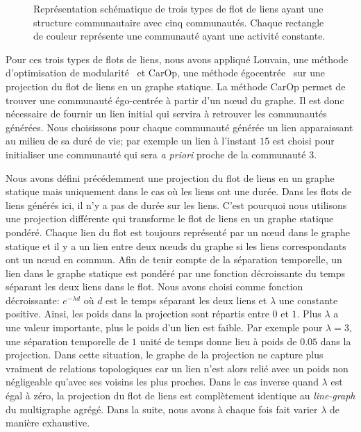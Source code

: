 \begin{figure}
\begin{subfigure}{0.3\textwidth}
		\caption{}
		\label{fig:versqualite_gen_test3}
	\end{subfigure}
	\caption{Représentation schématique de trois types de flot de liens ayant une structure communautaire avec cinq communautés.
	Chaque rectangle de couleur représente une communauté ayant une activité constante.}
	\label{fig:versqualite_gen_test}
\end{figure}

\bigskip
Pour ces trois types de flots de liens, nous avons appliqué Louvain, une méthode d'optimisation de modularité~\cite{Blondel2008a} et CarOp, une méthode égocentrée~\cite{Danisch2012} sur une projection du flot de liens en un graphe statique.
La méthode CarOp permet de trouver une communauté égo-centrée à partir d'un n\oe{}ud du graphe.
Il est donc nécessaire de fournir un lien initial qui servira à retrouver les communautés générées.
Nous choisissons pour chaque communauté générée un lien apparaissant au milieu de sa duré de vie; par exemple un lien à l'instant $15$ est choisi pour initialiser une communauté qui sera \emph{a priori} proche de la communauté $3$.


Nous avons défini précédemment une projection du flot de liens en un graphe statique mais uniquement dans le cas où les liens ont une durée.
Dans les flots de liens générés ici, il n'y a pas de durée sur les liens.
C'est pourquoi nous utilisons une projection différente qui transforme le flot de liens en un graphe statique pondéré.
Chaque lien du flot est toujours représenté par un n\oe{}ud dans le graphe statique et il y a un lien entre deux n\oe{}uds du graphe si les liens correspondants ont un n\oe{}ud en commun.
Afin de tenir compte de la séparation temporelle, un lien dans le graphe statique est pondéré par une fonction décroissante du temps séparant les deux liens dans le flot.
Nous avons choisi comme fonction décroissante: $e^{-\lambda d}$ où $d$ est le temps séparant les deux liens et $\lambda$ une constante positive.
Ainsi, les poids dans la projection sont répartis entre $0$ et $1$.
Plus $\lambda$ a une valeur importante, plus le poids d'un lien est faible.
Par exemple pour $\lambda=3$, une séparation temporelle de $1$ unité de temps donne lieu à poids de $0.05$ dans la projection.
Dans cette situation, le graphe de la projection ne capture plus vraiment de relations topologiques car un lien n'est alors relié avec un poids non négligeable qu'avec ses voisins les plus proches.
Dans le cas inverse quand $\lambda$ est égal à zéro, la projection du flot de liens est complètement identique au \emph{line-graph} du multigraphe agrégé.
Dans la suite, nous avons à chaque fois fait varier $\lambda$ de manière exhaustive.

